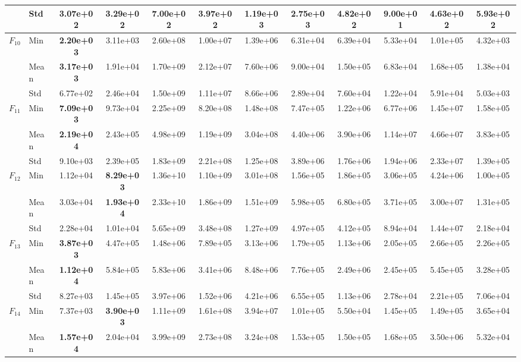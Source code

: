 \begin{center}
\begin{longtable}{clcccccccccc}
 & Std & 3.07e+02 & 3.29e+02 & 7.00e+02 & 3.97e+02 & 1.19e+03 & 2.75e+03 & 4.82e+02 & 9.00e+01 & 4.63e+02 & 5.93e+02 \\
\midrule
\multirow{3}{*}{$F_{10}$} & Min & \textbf{2.20e+03} & 3.11e+03 & 2.60e+08 & 1.00e+07 & 1.39e+06 & 6.31e+04 & 6.39e+04 & 5.33e+04 & 1.01e+05 & 4.32e+03 \\
 & Mean & \textbf{3.17e+03} & 1.91e+04 & 1.70e+09 & 2.12e+07 & 7.60e+06 & 9.00e+04 & 1.50e+05 & 6.83e+04 & 1.68e+05 & 1.38e+04 \\
 & Std & 6.77e+02 & 2.46e+04 & 1.50e+09 & 1.11e+07 & 8.66e+06 & 2.89e+04 & 7.60e+04 & 1.22e+04 & 5.91e+04 & 5.03e+03 \\
\midrule
\multirow{3}{*}{$F_{11}$} & Min & \textbf{7.09e+03} & 9.73e+04 & 2.25e+09 & 8.20e+08 & 1.48e+08 & 7.47e+05 & 1.22e+06 & 6.77e+06 & 1.45e+07 & 1.58e+05 \\
 & Mean & \textbf{2.19e+04} & 2.43e+05 & 4.98e+09 & 1.19e+09 & 3.04e+08 & 4.40e+06 & 3.90e+06 & 1.14e+07 & 4.66e+07 & 3.83e+05 \\
 & Std & 9.10e+03 & 2.39e+05 & 1.83e+09 & 2.21e+08 & 1.25e+08 & 3.89e+06 & 1.76e+06 & 1.94e+06 & 2.33e+07 & 1.39e+05 \\
\midrule
\multirow{3}{*}{$F_{12}$} & Min & 1.12e+04 & \textbf{8.29e+03} & 1.36e+10 & 1.10e+09 & 3.01e+08 & 1.56e+05 & 1.86e+05 & 3.06e+05 & 4.24e+06 & 1.00e+05 \\
 & Mean & 3.03e+04 & \textbf{1.93e+04} & 2.33e+10 & 1.86e+09 & 1.51e+09 & 5.98e+05 & 6.80e+05 & 3.71e+05 & 3.00e+07 & 1.31e+05 \\
 & Std & 2.28e+04 & 1.01e+04 & 5.65e+09 & 3.48e+08 & 1.27e+09 & 4.97e+05 & 4.12e+05 & 8.94e+04 & 1.44e+07 & 2.18e+04 \\
\midrule
\multirow{3}{*}{$F_{13}$} & Min & \textbf{3.87e+03} & 4.47e+05 & 1.48e+06 & 7.89e+05 & 3.13e+06 & 1.79e+05 & 1.13e+06 & 2.05e+05 & 2.66e+05 & 2.26e+05 \\
 & Mean & \textbf{1.12e+04} & 5.84e+05 & 5.83e+06 & 3.41e+06 & 8.48e+06 & 7.76e+05 & 2.49e+06 & 2.45e+05 & 5.45e+05 & 3.28e+05 \\
 & Std & 8.27e+03 & 1.45e+05 & 3.97e+06 & 1.52e+06 & 4.21e+06 & 6.55e+05 & 1.13e+06 & 2.78e+04 & 2.21e+05 & 7.06e+04 \\
\midrule
\multirow{3}{*}{$F_{14}$} & Min & 7.37e+03 & \textbf{3.90e+03} & 1.11e+09 & 1.61e+08 & 3.94e+07 & 1.01e+05 & 5.50e+04 & 1.45e+05 & 1.49e+05 & 3.65e+04 \\
 & Mean & \textbf{1.57e+04} & 2.04e+04 & 3.99e+09 & 2.73e+08 & 3.24e+08 & 1.53e+05 & 1.50e+05 & 1.68e+05 & 3.50e+06 & 5.32e+04 \\

\end{longtable}
\end{center}
